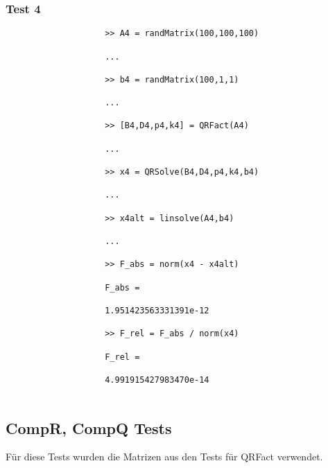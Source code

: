\documentclass[11pt,titlepage]{article}
\begin{document}
			\subsubsection{Test 4}
				\begin{lstlisting}
					>> A4 = randMatrix(100,100,100)
					
					...
					
					>> b4 = randMatrix(100,1,1)
					
					...
					
					>> [B4,D4,p4,k4] = QRFact(A4)
					
					...
					
					>> x4 = QRSolve(B4,D4,p4,k4,b4)
					
					...
					
					>> x4alt = linsolve(A4,b4)
					
					...
					
					>> F_abs = norm(x4 - x4alt)
					
					F_abs =
					
					1.951423563331391e-12
					
					>> F_rel = F_abs / norm(x4)
					
					F_rel =
					
					4.991915427983470e-14
						
				\end{lstlisting}

\newpage
		\subsection{CompR, CompQ Tests}
		Für diese Tests wurden die Matrizen aus den Tests für QRFact verwendet.
\end{document}
